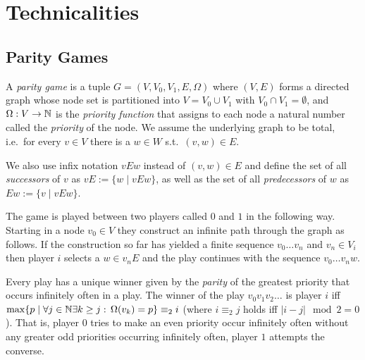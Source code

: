 \section{Technicalities}

\subsection{Parity Games}

A \emph{parity game} is a tuple $G = (V,V_0,V_1,E,\Omega)$ where $(V,E)$ forms a directed graph
whose node set is partitioned into $V = V_0 \cup V_1$ with $V_0 \cap V_1 = \emptyset$, and
$\Omega : V \to \mathbb{N}$ is the \emph{priority function} that assigns to each node a natural number
called the \emph{priority} of the node. We assume the underlying graph to be total, i.e.\ for every
$v \in V$ there is a $w \in W$ s.t.\ $(v,w) \in E$.

We also use infix notation $vEw$ instead of $(v,w) \in E$ and define the set of all \emph{successors} of
$v$ as $vE := \{ w \mid vEw \}$, as well as the set of all \emph{predecessors} of $w$ as
$Ew := \{ v \mid vEw \}$.

The game is played between two players called $0$ and $1$ in the following way. Starting in a node
$v_0 \in V$ they construct an infinite path through the graph as follows. If the construction so far
has yielded a finite sequence $v_0\ldots v_n$ and $v_n \in V_i$ then player $i$ selects a $w \in v_nE$
and the play continues with the sequence $v_0\ldots v_n w$.

Every play has a unique winner given by the \emph{parity} of the greatest priority that occurs infinitely 
often in a play. The winner of the play $v_0 v_1 v_2 \ldots$ is player $i$ iff
$\max \{ p \mid \forall j \in \mathbb{N} \exists k \geq j:\, \Omega(v_k) = p \} \equiv_2 i$ (where $i \equiv_2 j$ holds iff $|i - j| \mod 2 = 0$). That is, player $0$ tries to make an even
priority occur infinitely often without any greater odd priorities occurring infinitely often, player
$1$ attempts the converse.


